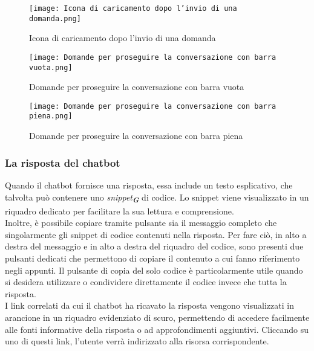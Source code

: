 \newpage

\begin{figure}[h]
    \centering
        \texttt{[image: Icona di caricamento dopo l'invio di una domanda.png]}
        \caption{Icona di caricamento dopo l'invio di una domanda}
        \label{fig:Icona di caricamento dopo l'invio di una domanda}
\end{figure}
\begin{figure}[h]
    \centering
        \texttt{[image: Domande per proseguire la conversazione con barra vuota.png]}
        \caption{Domande per proseguire la conversazione con barra vuota}
        \label{fig:Domande per proseguire la conversazione con barra vuota}        
\end{figure}
\begin{figure}[h]
    \centering
        \texttt{[image: Domande per proseguire la conversazione con barra piena.png]}
        \caption{Domande per proseguire la conversazione con barra piena}
        \label{fig:Domande per proseguire la conversazione con barra piena}        
\end{figure}


 
\subsubsection{La risposta del chatbot}  
\label{subsec:la_risposta_del_chatbot}  

Quando il chatbot fornisce una risposta, essa include un testo esplicativo, che talvolta può contenere uno \emph{snippet}\textsubscript{\textbf{\textit{G}}} di codice. Lo snippet viene visualizzato in un riquadro dedicato per facilitare la sua lettura e comprensione.\\
Inoltre, è possibile copiare tramite pulsante sia il messaggio completo che singolarmente gli snippet di codice contenuti nella risposta. Per fare ciò, in alto a destra del messaggio e in alto a destra del riquadro del codice, sono presenti due pulsanti dedicati che permettono di copiare il contenuto a cui fanno riferimento negli appunti. Il pulsante di copia del solo codice è particolarmente utile quando si desidera utilizzare o condividere direttamente il codice invece che tutta la risposta.\\
I link correlati da cui il chatbot ha ricavato la risposta vengono visualizzati in arancione in un riquadro evidenziato di scuro, permettendo di accedere facilmente alle fonti informative della risposta o ad approfondimenti aggiuntivi. Cliccando su uno di questi link, l'utente verrà indirizzato alla risorsa corrispondente.\\

